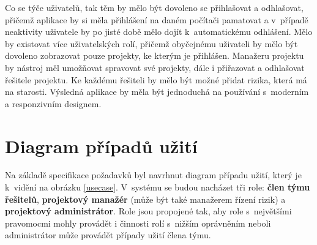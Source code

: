 Co se týče uživatelů, tak těm by mělo být dovoleno se přihlašovat a odhlašovat, přičemž aplikace by si měla přihlášení na daném počítači pamatovat a v~případě neaktivity uživatele by po jisté době mělo dojít k~automatickému odhlášení. Mělo by existovat více uživatelských rolí, přičemž obyčejnému uživateli by mělo být dovoleno zobrazovat pouze projekty, ke kterým je přihlášen. Manažeru projektu by nástroj měl umožňovat spravovat své projekty, dále i přiřazovat a odhlašovat řešitele projektu. Ke každému řešiteli by mělo být možné přidat rizika, která má na starosti.
Výsledná aplikace by měla být jednoduchá na používání s~moderním a responzivním designem.

\section{Diagram případů užití}

Na základě specifikace požadavků byl navrhnut diagram případu užití, který je k~vidění na obrázku \ref{usecase}. V~systému se budou nacházet tři role: \textbf{člen týmu řešitelů}, \textbf{projektový manažér} (může být také manažerem řízení rizik) a \textbf{projektový administrátor}. Role jsou propojené tak, aby role s~největšími pravomocmi mohly provádět i činnosti rolí s~nižším oprávněním neboli administrátor může provádět případy užití člena týmu.

